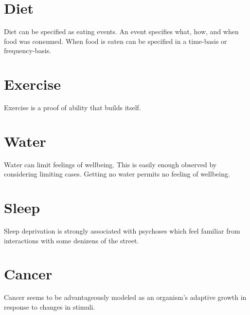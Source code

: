 \chapter{Diet}
Diet can be specified as eating events.
An event specifies what, how, and when food was consumed.
When food is eaten can be specified in a time-basis or frequency-basis.

\chapter{Exercise}
Exercise is a proof of ability that builds itself.

\chapter{Water}
Water can limit feelings of wellbeing.
This is easily enough observed by considering limiting cases.
Getting no water permits no feeling of wellbeing.

\chapter{Sleep}
Sleep deprivation is strongly associated with psychoses which feel familiar from interactions with some denizens of the street.

\chapter{Cancer}
Cancer seems to be advantageously modeled as an organism's adaptive growth in response to changes in stimuli.


